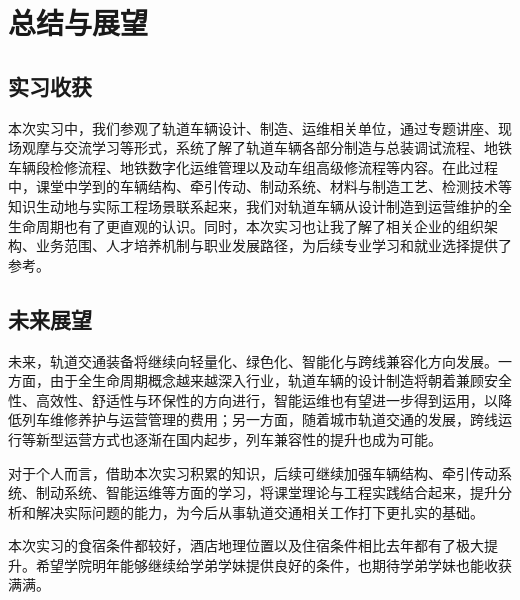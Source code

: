 ﻿\section{总结与展望}

\subsection{实习收获}
本次实习中，我们参观了轨道车辆设计、制造、运维相关单位，通过专题讲座、现场观摩与交流学习等形式，系统了解了轨道车辆各部分制造与总装调试流程、地铁车辆段检修流程、地铁数字化运维管理以及动车组高级修流程等内容。在此过程中，课堂中学到的车辆结构、牵引传动、制动系统、材料与制造工艺、检测技术等知识生动地与实际工程场景联系起来，我们对轨道车辆从设计制造到运营维护的全生命周期也有了更直观的认识。同时，本次实习也让我了解了相关企业的组织架构、业务范围、人才培养机制与职业发展路径，为后续专业学习和就业选择提供了参考。\par{}

\subsection{未来展望}
未来，轨道交通装备将继续向轻量化、绿色化、智能化与跨线兼容化方向发展。一方面，由于全生命周期概念越来越深入行业，轨道车辆的设计制造将朝着兼顾安全性、高效性、舒适性与环保性的方向进行，智能运维也有望进一步得到运用，以降低列车维修养护与运营管理的费用；另一方面，随着城市轨道交通的发展，跨线运行等新型运营方式也逐渐在国内起步，列车兼容性的提升也成为可能。\par{}
对于个人而言，借助本次实习积累的知识，后续可继续加强车辆结构、牵引传动系统、制动系统、智能运维等方面的学习，将课堂理论与工程实践结合起来，提升分析和解决实际问题的能力，为今后从事轨道交通相关工作打下更扎实的基础。\par{}
本次实习的食宿条件都较好，酒店地理位置以及住宿条件相比去年都有了极大提升。希望学院明年能够继续给学弟学妹提供良好的条件，也期待学弟学妹也能收获满满。\par{}
